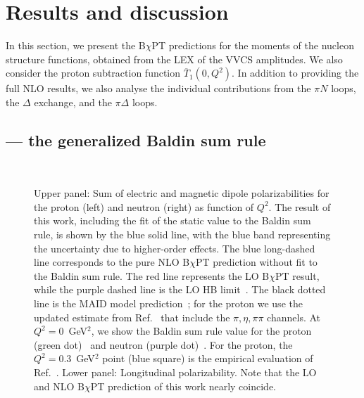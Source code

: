 \documentclass[12pt,preprint,tightenlines,
showpacs,preprintnumbers,amsmath,amssymb,
a4paper,nofootinbib]{revtex4-1}
\def\ol#1{\overline{#1}}
\begin{document}
\section{Results and discussion}

In this section, we present the B$\chi$PT predictions for the moments of the nucleon structure functions, obtained from the LEX of the VVCS amplitudes. We also consider the proton subtraction function $\ol{T}_1(0,Q^2)$. In addition to providing the full NLO results, we also analyse the individual contributions from the $\pi N$ loops, the $\Delta$ exchange, and the $\pi \Delta$ loops. 





\label{Sec:Scalar-Pol}

\subsection{ --- the generalized Baldin sum rule}


\begin{figure}[hbt]
\begin{center}
 \\
\vspace{0.5cm}
\caption{Upper panel: Sum of electric and magnetic dipole polarizabilities for the proton (left) and neutron (right) as function of $Q^2$.  
The result of this work, including the fit of the static value to the Baldin sum rule, is shown by the blue solid line, with the blue band representing the uncertainty due to higher-order effects. The blue long-dashed line corresponds to the pure NLO B$\chi$PT prediction without fit to the Baldin sum rule.
The red line represents the LO B$\chi$PT result, while the purple dashed line is the LO HB limit~\cite{Nevado:2007dd}.
The black dotted line is the MAID model prediction~\cite{Drechsel:2000ct,Drechsel:1998hk,private-Lothar};  for the proton we use the updated estimate from Ref.~\cite{Drechsel:2002ar} that include the $\pi, \eta, \pi\pi$ channels.
At $Q^2=0$~GeV$^2$, we show the Baldin sum rule value for the proton (green dot)~\cite{Gryniuk:2015aa} and neutron (purple dot)~\cite{Levchuk:1999zy}.
 For the proton, the $Q^2=0.3$~GeV$^2$ point (blue square) is the empirical evaluation of Ref.~\cite{Liang:2004tk}. Lower panel: Longitudinal polarizability. Note that the LO and NLO B$\chi$PT prediction of this work nearly coincide. 
 \label{Fig:alpha+betaplot}}
\end{center}
\end{figure}
\end{document}
